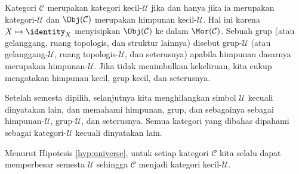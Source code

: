 Kategori $\mathcal{C}$ merupakan kategori kecil-$\mathcal{U}$ jika dan hanya jika ia merupakan kategori-$\mathcal{U}$ dan $\Obj(\mathcal{C})$ merupakan himpunan kecil-$\mathcal{U}$. Hal ini karena $X \mapsto \identity_X$ menyisipkan $\Obj(\mathcal{C})$ ke dalam $\Mor(\mathcal{C})$. Sebuah grup (atau gelanggang, ruang topologis, dan struktur lainnya) disebut grup-$\mathcal{U}$ (atau gelanggang-$\mathcal{U}$, ruang topologis-$\mathcal{U}$, dan seterusnya) apabila himpunan dasarnya merupakan himpunan-$\mathcal{U}$. Jika tidak menimbulkan kekeliruan, kita cukup mengatakan himpunan kecil, grup kecil, dan seterusnya.

\begin{convention}\label{con:U-small}
	Setelah semesta dipilih, selanjutnya kita menghilangkan simbol $\mathcal{U}$ kecuali dinyatakan lain, dan memahami himpunan, grup, dan sebagainya sebagai himpunan-$\mathcal{U}$, grup-$\mathcal{U}$, dan seterusnya. Semua kategori yang dibahas dipahami sebagai kategori-$\mathcal{U}$ kecuali dinyatakan lain.
\end{convention}

Menurut Hipotesis \ref{hyp:universe}, untuk setiap kategori $\mathcal{C}$ kita selalu dapat memperbesar semesta $\mathcal{U}$ sehingga $\mathcal{C}$ menjadi kategori kecil-$\mathcal{U}$.

